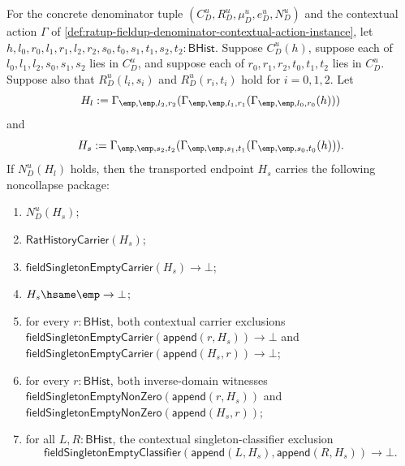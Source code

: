 \begin{theorem}
\label{thm:ratup-fieldup-threefold-pair-transported-noncollapse-package}
For the concrete denominator tuple
$(C_D^u,R_D^u,\mu_D^u,e_D^u,N_D^u)$ and the contextual action $\Gamma$ of
\autoref{def:ratup-fieldup-denominator-contextual-action-instance}, let
$h,l_0,r_0,l_1,r_1,l_2,r_2,s_0,t_0,s_1,t_1,s_2,t_2:\mathsf{BHist}$.
Suppose $C_D^u(h)$, suppose each of $l_0,l_1,l_2,s_0,s_1,s_2$ lies in
$C_D^u$, and suppose each of $r_0,r_1,r_2,t_0,t_1,t_2$ lies in $C_D^u$.
Suppose also that $R_D^u(l_i,s_i)$ and $R_D^u(r_i,t_i)$ hold for
$i=0,1,2$. Let
$$
H_l:=
\Gamma_{\emp,\emp,l_2,r_2}
(\Gamma_{\emp,\emp,l_1,r_1}(\Gamma_{\emp,\emp,l_0,r_0}(h)))
$$
and
$$
H_s:=
\Gamma_{\emp,\emp,s_2,t_2}
(\Gamma_{\emp,\emp,s_1,t_1}(\Gamma_{\emp,\emp,s_0,t_0}(h))).
$$
If $N_D^u(H_l)$ holds, then the transported endpoint $H_s$ carries the
following noncollapse package:
\begin{enumerate}
  \item $N_D^u(H_s)$;
  \item $\mathsf{RatHistoryCarrier}(H_s)$;
  \item $\mathsf{fieldSingletonEmptyCarrier}(H_s)\to\bot$;
  \item $H_s\hsame\emp\to\bot$;
  \item for every $r:\mathsf{BHist}$, both contextual carrier exclusions
  $\mathsf{fieldSingletonEmptyCarrier}(\mathsf{append}(r,H_s))\to\bot$ and
  $\mathsf{fieldSingletonEmptyCarrier}(\mathsf{append}(H_s,r))\to\bot$;
  \item for every $r:\mathsf{BHist}$, both inverse-domain witnesses
  $\mathsf{fieldSingletonEmptyNonZero}(\mathsf{append}(r,H_s))$ and
  $\mathsf{fieldSingletonEmptyNonZero}(\mathsf{append}(H_s,r))$;
  \item for all $L,R:\mathsf{BHist}$, the contextual singleton-classifier
  exclusion
  $$
  \mathsf{fieldSingletonEmptyClassifier}
    (\mathsf{append}(L,H_s),\mathsf{append}(R,H_s))\to\bot.
  $$
\end{enumerate}
\end{theorem}
